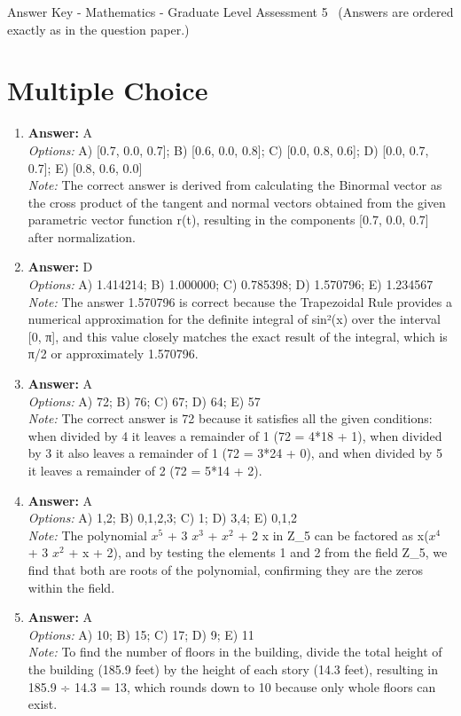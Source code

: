 \documentclass[12pt]{article}
\begin{document}
\begin{center}
Answer Key - Mathematics - Graduate Level Assessment 5 \
\small (Answers are ordered exactly as in the question paper.)
\end{center}

\section*{Multiple Choice}
\begin{enumerate}[label=\arabic*.]
\item \textbf{Answer:} A
\\ \textit{Options:} A) [0.7, 0.0, 0.7]; B) [0.6, 0.0, 0.8]; C) [0.0, 0.8, 0.6]; D) [0.0, 0.7, 0.7]; E) [0.8, 0.6, 0.0]
\\ \textit{Note:} The correct answer is derived from calculating the Binormal vector as the cross product of the tangent and normal vectors obtained from the given parametric vector function r(t), resulting in the components [0.7, 0.0, 0.7] after normalization.
\item \textbf{Answer:} D
\\ \textit{Options:} A) 1.414214; B) 1.000000; C) 0.785398; D) 1.570796; E) 1.234567
\\ \textit{Note:} The answer 1.570796 is correct because the Trapezoidal Rule provides a numerical approximation for the definite integral of sin²(x) over the interval [0, π], and this value closely matches the exact result of the integral, which is π/2 or approximately 1.570796.
\item \textbf{Answer:} A
\\ \textit{Options:} A) 72; B) 76; C) 67; D) 64; E) 57
\\ \textit{Note:} The correct answer is 72 because it satisfies all the given conditions: when divided by 4 it leaves a remainder of 1 (72 = 4*18 + 1), when divided by 3 it also leaves a remainder of 1 (72 = 3*24 + 0), and when divided by 5 it leaves a remainder of 2 (72 = 5*14 + 2).
\item \textbf{Answer:} A
\\ \textit{Options:} A) 1,2; B) 0,1,2,3; C) 1; D) 3,4; E) 0,1,2
\\ \textit{Note:} The polynomial $x^5$ + 3 $x^3$ + $x^2$ + 2 x in Z\_5 can be factored as x($x^4$ + 3 $x^2$ + x + 2), and by testing the elements 1 and 2 from the field Z\_5, we find that both are roots of the polynomial, confirming they are the zeros within the field.
\item \textbf{Answer:} A
\\ \textit{Options:} A) 10; B) 15; C) 17; D) 9; E) 11
\\ \textit{Note:} To find the number of floors in the building, divide the total height of the building (185.9 feet) by the height of each story (14.3 feet), resulting in 185.9 ÷ 14.3 = 13, which rounds down to 10 because only whole floors can exist.
\end{enumerate}
\end{document}
